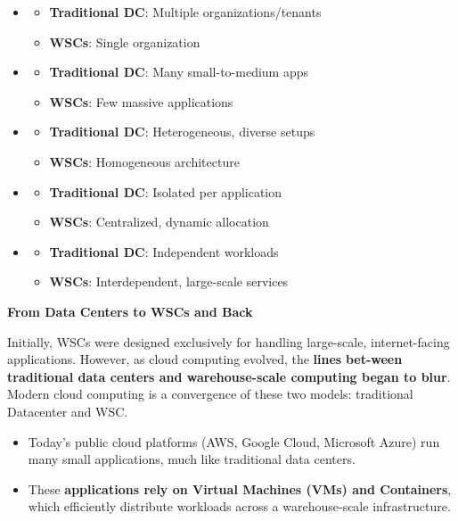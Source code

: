 \begin{itemize}
    \item {}
    \begin{itemize}
        \item \textbf{Traditional DC}: Multiple organizations/tenants
        \item \textbf{WSCs}: Single organization
    \end{itemize}
    \item {}
    \begin{itemize}
        \item \textbf{Traditional DC}: Many small-to-medium apps
        \item \textbf{WSCs}: Few massive applications
    \end{itemize}
    \item {}
    \begin{itemize}
        \item \textbf{Traditional DC}: Heterogeneous, diverse setups
        \item \textbf{WSCs}: Homogeneous architecture
    \end{itemize}
    \item {}
    \begin{itemize}
        \item \textbf{Traditional DC}: Isolated per application
        \item \textbf{WSCs}: Centralized, dynamic allocation
    \end{itemize}
    \item {}
    \begin{itemize}
        \item \textbf{Traditional DC}: Independent workloads
        \item \textbf{WSCs}: Interdependent, large-scale services
    \end{itemize}
\end{itemize}

\highspace
\begin{flushleft}
    \textcolor{Green3}{ \textbf{From Data Centers to WSCs and Back}}
\end{flushleft}
Initially, WSCs were designed exclusively for handling large-scale, internet-facing applications. However, as cloud computing evolved, the \textbf{lines} \textbf{bet-\break ween} \textbf{traditional data centers and warehouse-scale computing began to blur}. Modern cloud computing is a convergence of these two models: traditional Datacenter and WSC.
\begin{itemize}
    \item Today's public cloud platforms (AWS, Google Cloud, Microsoft Azure) run many small applications, much like traditional data centers.
    \item These \textbf{applications rely on Virtual Machines (VMs) and Containers}, which efficiently distribute workloads across a warehouse-scale infrastructure.
\end{itemize}

